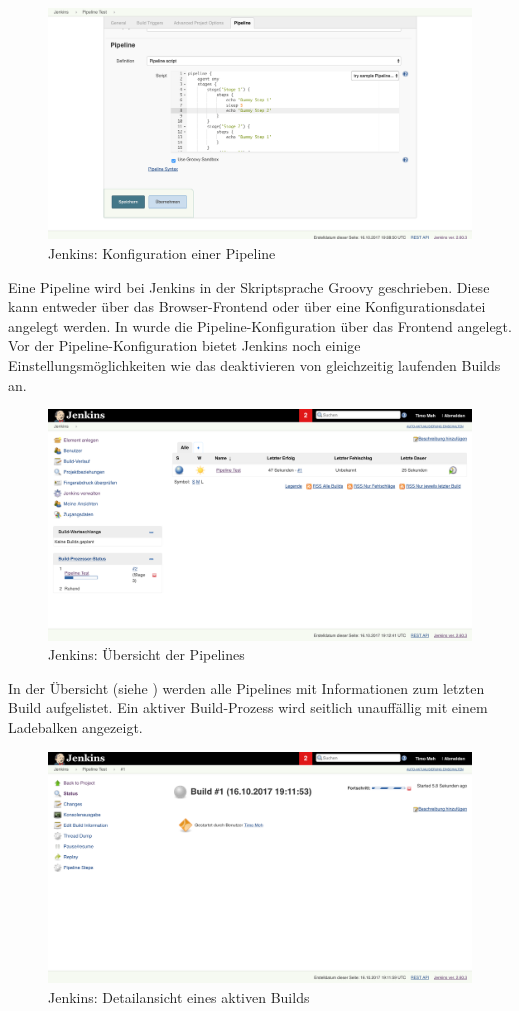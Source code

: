 \begin{figure}[h]
  \caption{Jenkins: Konfiguration einer Pipeline}
  \label{fig:jenkins-pipeline-config}
  \includegraphics[width=.8\textwidth]{assets/jenkins-pipeline-script}
\end{figure}

Eine Pipeline wird bei Jenkins in der Skriptsprache Groovy geschrieben. Diese kann entweder über das Browser-Frontend oder über eine Konfigurationsdatei angelegt werden. In  wurde die Pipeline-Konfiguration über das Frontend angelegt. Vor der Pipeline-Konfiguration bietet Jenkins noch einige Einstellungsmöglichkeiten wie das deaktivieren von gleichzeitig laufenden Builds an.

\begin{figure}[h]
  \caption{Jenkins: Übersicht der Pipelines}
  \label{fig:jenkins-pipeline-overview}
  \includegraphics[width=.8\textwidth]{assets/jenkins-pipeline-overview}
\end{figure}

In der Übersicht (siehe ) werden alle Pipelines mit Informationen zum letzten Build aufgelistet. Ein aktiver Build-Prozess wird seitlich unauffällig mit einem Ladebalken angezeigt.

\begin{figure}[h]
  \caption{Jenkins: Detailansicht eines aktiven Builds}
  \label{fig:jenkins-build-detail}
  \includegraphics[width=.8\textwidth]{assets/jenkins-build-detail}
\end{figure}

